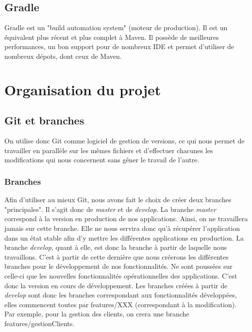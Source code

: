 		\subsection{Gradle}

			Gradle est un "build automation system" (moteur de production). Il est un équivalent plus récent et plus complet à Maven. Il possède de meilleures performances, un bon support pour de nombreux IDE et permet d'utiliser de nombreux dépots, dont ceux de Maven.

	\section{Organisation du projet}
		\subsection{Git et branches}
			On utilise donc Git comme logiciel de gestion de versions, ce qui nous permet de travailler en parallèle sur les mêmes fichiers et d'effectuer chacunes les modifications qui nous concernent sans gêner le travail de l'autre.
			\subsubsection{Branches}

				Afin d'utiliser au mieux Git, nous avons fait le choix de créer deux branches "principales". Il s'agit donc de \textit{master} et de \textit{develop}.\newline
				La branche \textit{master} correspond à la version en production de nos applications. Ainsi, on ne travaillera jamais sur cette branche. Elle ne nous servira donc qu'à récupérer l'application dans un état stable afin d'y mettre les différentes applications en production.\newline
				La branche \textit{develop}, quant à elle, est donc la branche à partir de laquelle nous travaillons. C'est à partir de cette dernière que nous créerons les différentes branches pour le développement de nos fonctionnalités. Ne sont poussées sur celle-ci que les nouvelles fonctionnalités opérationnelles des applications. C'est donc la version en cours de développement.\newline
				Les branches créées à partir de \textit{develop} sont donc les branches correspondant aux fonctionnalités développées, elles commencent toutes par features/XXX (correspondant à la modification). Par exemple, pour la gestion des clients, on crera une branche features/gestionClients.


